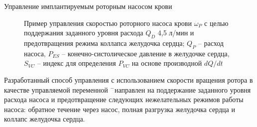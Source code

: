 \documentclass[a4paper, 9pt]{beamer}
\begin{document}
\begin{frame}{Управление имплантируемым роторным насосом крови}
\begin{minipage}[ht]{0.49\textwidth}
\end{minipage}
\hfill
\begin{minipage}[ht]{0.49\textwidth}
\vskip2pt
\begin{figure}
\vskip-6pt\caption{\tiny Пример управления скоростью роторного насоса крови $\omega_P$ с целью поддержания заданного уровня расхода $Q_D$ 4,5 л/мин и предотвращения режима коллапса желудочка сердца; $Q_P$ -- расход насоса, $P_{ES}$ -- конечно-систолическое давление в желудочке сердца, $S_{VC}$ -- индекс для определения $P_{VC}$ на основе производной $dQ/dt$} %
\end{figure}

\end{minipage}

\vskip2pt

\vskip-3pt
Разработанный способ управления с использованием скорости вращения ротора в качестве управляемой переменной \footnotemark[1]$^-$\footnotemark[3] направлен на поддержание заданного уровня расхода насоса и предотвращение следующих нежелательных режимов работы насоса: обратное течение через насос, полная разгрузка желудочка сердца и коллапс желудочка сердца.

\vskip6pt




\end{frame}
\end{document}
